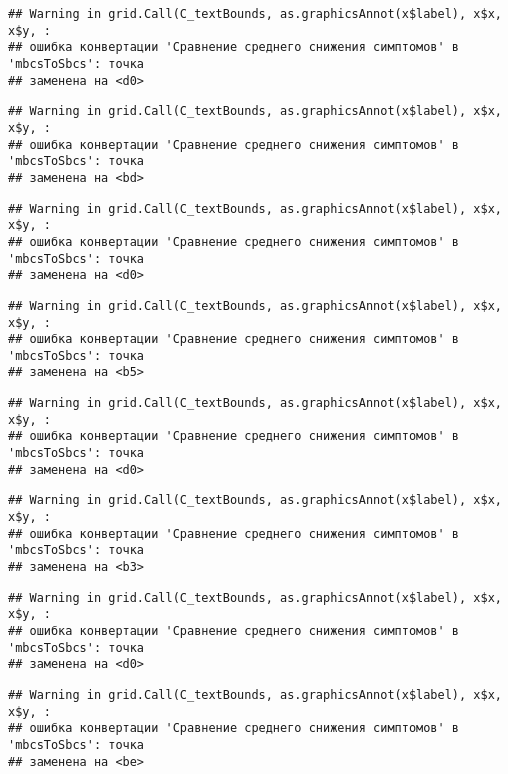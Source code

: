 \documentclass[
]{article}
\begin{document}
\begin{verbatim}
## Warning in grid.Call(C_textBounds, as.graphicsAnnot(x$label), x$x, x$y, :
## ошибка конвертации 'Сравнение среднего снижения симптомов' в 'mbcsToSbcs': точка
## заменена на <d0>
\end{verbatim}

\begin{verbatim}
## Warning in grid.Call(C_textBounds, as.graphicsAnnot(x$label), x$x, x$y, :
## ошибка конвертации 'Сравнение среднего снижения симптомов' в 'mbcsToSbcs': точка
## заменена на <bd>
\end{verbatim}

\begin{verbatim}
## Warning in grid.Call(C_textBounds, as.graphicsAnnot(x$label), x$x, x$y, :
## ошибка конвертации 'Сравнение среднего снижения симптомов' в 'mbcsToSbcs': точка
## заменена на <d0>
\end{verbatim}

\begin{verbatim}
## Warning in grid.Call(C_textBounds, as.graphicsAnnot(x$label), x$x, x$y, :
## ошибка конвертации 'Сравнение среднего снижения симптомов' в 'mbcsToSbcs': точка
## заменена на <b5>
\end{verbatim}

\begin{verbatim}
## Warning in grid.Call(C_textBounds, as.graphicsAnnot(x$label), x$x, x$y, :
## ошибка конвертации 'Сравнение среднего снижения симптомов' в 'mbcsToSbcs': точка
## заменена на <d0>
\end{verbatim}

\begin{verbatim}
## Warning in grid.Call(C_textBounds, as.graphicsAnnot(x$label), x$x, x$y, :
## ошибка конвертации 'Сравнение среднего снижения симптомов' в 'mbcsToSbcs': точка
## заменена на <b3>
\end{verbatim}

\begin{verbatim}
## Warning in grid.Call(C_textBounds, as.graphicsAnnot(x$label), x$x, x$y, :
## ошибка конвертации 'Сравнение среднего снижения симптомов' в 'mbcsToSbcs': точка
## заменена на <d0>
\end{verbatim}

\begin{verbatim}
## Warning in grid.Call(C_textBounds, as.graphicsAnnot(x$label), x$x, x$y, :
## ошибка конвертации 'Сравнение среднего снижения симптомов' в 'mbcsToSbcs': точка
## заменена на <be>
\end{verbatim}
\end{document}
